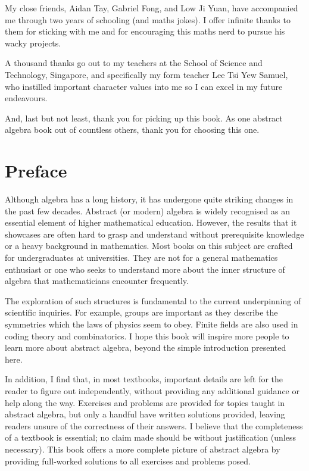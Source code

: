 My close friends, Aidan Tay, Gabriel Fong, and Low Ji Yuan, have accompanied me through two years of schooling (and maths jokes). I offer infinite thanks to them for sticking with me and for encouraging this maths nerd to pursue his wacky projects.

A thousand thanks go out to my teachers at the School of Science and Technology, Singapore, and specifically my form teacher Lee Tsi Yew Samuel, who instilled important character values into me so I can excel in my future endeavours.

And, last but not least, thank you for picking up this book. As one abstract algebra book out of countless others, thank you for choosing this one.

\chapter{Preface}
Although algebra has a long history, it has undergone quite striking changes in the past few decades. Abstract (or modern) algebra is widely recognised as an essential element of higher mathematical education. However, the results that it showcases are often hard to grasp and understand without prerequisite knowledge or a heavy background in mathematics. Most books on this subject are crafted for undergraduates at universities. They are not for a general mathematics enthusiast or one who seeks to understand more about the inner structure of algebra that mathematicians encounter frequently.

The exploration of such structures is fundamental to the current underpinning of scientific inquiries. For example, groups are important as they describe the symmetries which the laws of physics seem to obey. Finite fields are also used in coding theory and combinatorics. I hope this book will inspire more people to learn more about abstract algebra, beyond the simple introduction presented here.

In addition, I find that, in most textbooks, important details are left for the reader to figure out independently, without providing any additional guidance or help along the way. Exercises and problems are provided for topics taught in abstract algebra, but only a handful have written solutions provided, leaving readers unsure of the correctness of their answers. I believe that the completeness of a textbook is essential; no claim made should be without justification (unless necessary). This book offers a more complete picture of abstract algebra by providing full-worked solutions to all exercises and problems posed.

